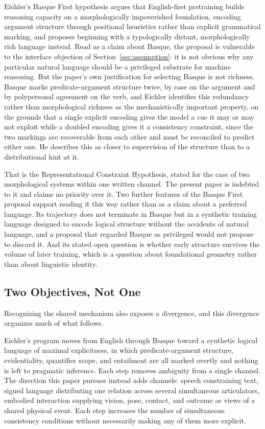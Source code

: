 \documentclass[11pt]{article}
\begin{document}
Eichler's Basque First hypothesis argues that English-first pretraining builds reasoning capacity on a morphologically impoverished foundation, encoding argument structure through positional heuristics rather than explicit grammatical marking, and proposes beginning with a typologically distant, morphologically rich language instead. Read as a claim about Basque, the proposal is vulnerable to the interface objection of Section~\ref{sec:assumption}: it is not obvious why any particular natural language should be a privileged substrate for machine reasoning. But the paper's own justification for selecting Basque is not richness. Basque marks predicate-argument structure twice, by case on the argument and by polypersonal agreement on the verb, and Eichler identifies this redundancy rather than morphological richness as the mechanistically important property, on the grounds that a single explicit encoding gives the model a cue it may or may not exploit while a doubled encoding gives it a consistency constraint, since the two markings are recoverable from each other and must be reconciled to predict either one. He describes this as closer to supervision of the structure than to a distributional hint at it.

That is the Representational Constraint Hypothesis, stated for the case of two morphological systems within one written channel. The present paper is indebted to it and claims no priority over it. Two further features of the Basque First proposal support reading it this way rather than as a claim about a preferred language. Its trajectory does not terminate in Basque but in a synthetic training language designed to encode logical structure without the accidents of natural language, and a proposal that regarded Basque as privileged would not propose to discard it. And its stated open question is whether early structure survives the volume of later training, which is a question about foundational geometry rather than about linguistic identity.

\subsection{Two Objectives, Not One}

Recognizing the shared mechanism also exposes a divergence, and this divergence organizes much of what follows.

Eichler's program moves from English through Basque toward a synthetic logical language of maximal explicitness, in which predicate-argument structure, evidentiality, quantifier scope, and entailment are all marked overtly and nothing is left to pragmatic inference. Each step removes ambiguity from a single channel. The direction this paper pursues instead adds channels: speech constraining text, signed language distributing one relation across several simultaneous articulators, embodied interaction supplying vision, pose, contact, and outcome as views of a shared physical event. Each step increases the number of simultaneous consistency conditions without necessarily making any of them more explicit.
\end{document}
